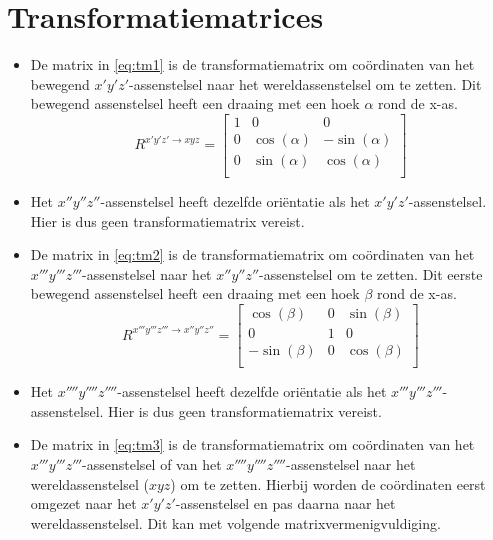 \section{Transformatiematrices}
\begin{itemize}
\item De matrix in \eqref{eq:tm1} is de transformatiematrix om coördinaten van het bewegend $x'y'z'$-assenstelsel naar het wereldassenstelsel om te zetten. Dit bewegend assenstelsel heeft een draaing met een hoek $\alpha$ rond de x-as.
\begin{equation}
R^{x'y'z' \rightarrow xyz}=
\begin{bmatrix}
1			&			0			&			0		   \\
0			&\cos(\alpha)&-\sin(\alpha)\\
0			&\sin(\alpha)&\cos(\alpha) \\
\end{bmatrix}
\label{eq:tm1}
\end{equation}
\item Het $x''y''z''$-assenstelsel heeft dezelfde oriëntatie als het $x'y'z'$-assenstelsel. Hier is dus geen transformatiematrix vereist.
\item De matrix in \eqref{eq:tm2} is de transformatiematrix om coördinaten van het $x'''y'''z'''$-assenstelsel naar het $x''y''z''$-assenstelsel om te zetten. Dit eerste bewegend assenstelsel heeft een draaing met een hoek $\beta$ rond de x-as.
\begin{equation}
R^{x'''y'''z''' \rightarrow x''y''z''}=
\begin{bmatrix}
\cos(\beta)	&			0			&\sin(\beta)\\
0						&			1			&			0		 \\
-\sin(\beta)&			0			&\cos(\beta)\\
\end{bmatrix}
\label{eq:tm2}
\end{equation}
\item Het $x''''y''''z''''$-assenstelsel heeft dezelfde oriëntatie als het $x'''y'''z'''$-assenstelsel. Hier is dus geen transformatiematrix vereist.
\item De matrix in \eqref{eq:tm3} is de transformatiematrix om coördinaten van het $x'''y'''z'''$-assenstelsel of van het $x''''y''''z''''$-assenstelsel naar het wereldassenstelsel ($xyz$) om te zetten. Hierbij worden de coördinaten eerst omgezet naar het $x'y'z'$-assenstelsel en pas daarna naar het wereldassenstelsel. Dit kan met volgende matrixvermenigvuldiging.
\begin{equation}

\end{equation}
\end{itemize}
